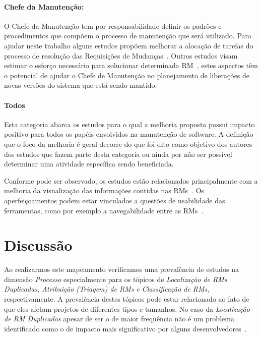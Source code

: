 \paragraph{Chefe da Manutenção:}

O Chefe da Manutenção tem por responsabilidade definir os padrões e
procedimentos que compõem o processo de manutenção que será utilizado. Para
ajudar neste trabalho alguns estudos propõem melhorar a alocação de tarefas do
processo de resolução das Requisições de Mudanças~\cite{netto2010automated}.
Outros estudos visam estimar o esforço necessário para solucionar determinada
RM~\cite{Vijayakumar2014, Nagwani2010}, estes aspectos têm o potencial de ajudar
o Chefe de Manutenção no planejamento de liberações de novas versões do sistema
que está sendo mantido.

\paragraph{Todos} Esta categoria abarca os estudos para o qual a melhoria
proposta possui impacto positivo para todos os papéis envolvidos na manutenção
de software. A definição que o foco da melhoria é geral decorre do que foi dito
como objetivo dos autores dos estudos que fazem parte desta categoria ou ainda
por não ser possível determinar uma atividade específica sendo beneficiada.

Conforme pode ser observado, os estudos estão relacionados principalmente com a
melhoria da  visualização das informações contidas nas RMs~\cite{hora2012bug,
	takama2013application, dal2014bug}. Os aperfeiçoamentos podem estar
vinculados a questões de usabilidade das ferramentas, como por exemplo a
navegabilidade entre as RMs~\cite{dal2014bug}.

\section{Discussão}
\label{sec:discussao}

Ao realizarmos este mapeamento verificamos uma prevalência de estudos na
dimensão \textit{Processo} especialmente para os tópicos de \textit{Localização
	de RMs Duplicadas, Atribuição (Triagem) de RMs e Classificação de RMs},
respectivamente. A prevalência destes tópicos pode estar relacionado ao fato de
que eles afetam projetos de diferentes tipos e tamanhos. No caso da
\textit{Localização de RM Duplicados} apesar de ser o de maior frequência não é
um problema identificado como o de impacto mais significativo por alguns
desenvolvedores~\cite{Bettenburg2008a}.

